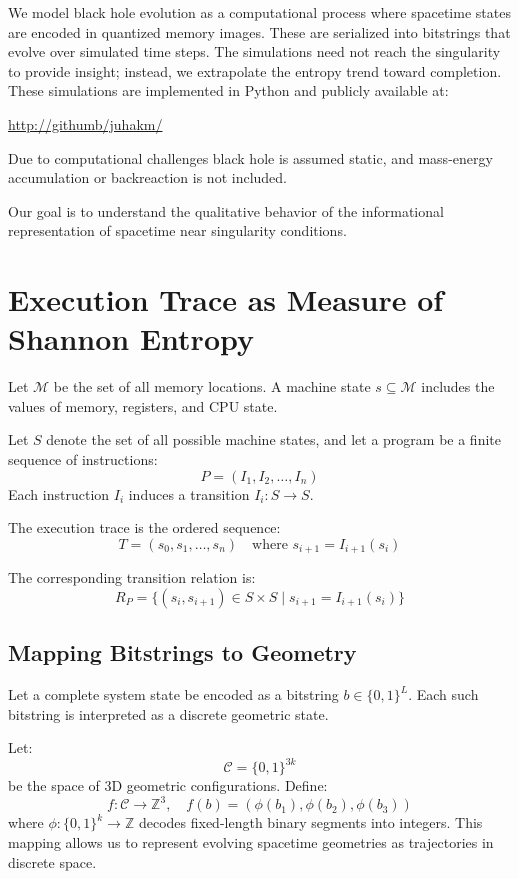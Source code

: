 \documentclass[11pt]{article}
\begin{document}
We model black hole evolution as a computational process where spacetime states are encoded in quantized memory images. These are serialized into bitstrings that evolve over simulated time steps. The simulations need not reach the singularity to provide insight; instead, we extrapolate the entropy trend toward completion. These simulations are implemented in Python and publicly available at:

\url{http://githumb/juhakm/}

Due to computational challenges black hole is assumed static, and mass-energy accumulation or backreaction is not included.

Our goal is to understand the qualitative behavior of the informational representation of spacetime near singularity conditions.



\section{Execution Trace as Measure of Shannon Entropy}

Let $\mathcal{M}$ be the set of all memory locations. A machine state $s \subseteq \mathcal{M}$ includes the values of memory, registers, and CPU state.

Let $S$ denote the set of all possible machine states, and let a program be a finite sequence of instructions:
\[
  P = (I_1, I_2, \dots, I_n)
\]
Each instruction $I_i$ induces a transition $I_i : S \to S$.

The execution trace is the ordered sequence:
\[
  T = (s_0, s_1, \dots, s_n) \quad \text{where } s_{i+1} = I_{i+1}(s_i)
\]

The corresponding transition relation is:
\[
  R_P = \{ (s_i, s_{i+1}) \in S \times S \mid s_{i+1} = I_{i+1}(s_i) \}
\]


\subsection{Mapping Bitstrings to Geometry}

Let a complete system state be encoded as a bitstring $b \in \{0,1\}^L$. Each such bitstring is interpreted as a discrete geometric state.

Let:
\[
  \mathcal{C} = \{0,1\}^{3k}
\]
be the space of 3D geometric configurations. Define:
\[
  f : \mathcal{C} \to \mathbb{Z}^3, \quad f(b) = (\phi(b_1), \phi(b_2), \phi(b_3))
\]
where $\phi : \{0,1\}^k \to \mathbb{Z}$ decodes fixed-length binary segments into integers. This mapping allows us to represent evolving spacetime geometries as trajectories in discrete space.
\end{document}

